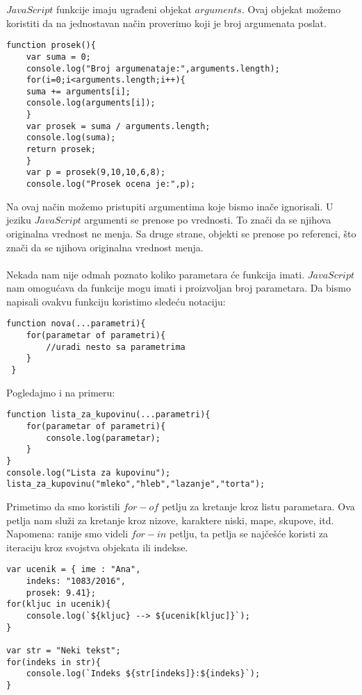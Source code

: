 $JavaScript$ funkcije imaju ugrađeni objekat $arguments$. Ovaj objekat možemo koristiti da na jednostavan način proverimo koji je broj argumenata poslat.
\begin{lstlisting}[backgroundcolor = \color{lightgray}, breaklines=true]
 function prosek(){
	var suma = 0;
	console.log("Broj argumenataje:",arguments.length);
	for(i=0;i<arguments.length;i++){
    suma += arguments[i];
	console.log(arguments[i]);
    }
	var prosek = suma / arguments.length;
    console.log(suma);
	return prosek;
    }
	var p = prosek(9,10,10,6,8);
    console.log("Prosek ocena je:",p);	
\end{lstlisting}
Na ovaj način možemo pristupiti argumentima koje bismo inače ignorisali.
U jeziku $JavaScript$ argumenti se prenose po vrednosti. To znači da se njihova originalna vrednost ne menja. Sa druge strane, objekti se prenose po referenci, što znači da se njihova originalna vrednost menja.\\\\
Nekada nam nije odmah poznato koliko parametara će funkcija imati. $JavaScript$ nam omogućava da funkcije mogu imati i proizvoljan broj parametara. Da bismo napisali ovakvu funkciju koristimo sledeću notaciju:
\begin{lstlisting}[backgroundcolor = \color{lightgray}, breaklines=true]
 function nova(...parametri){
	for(parametar of parametri){
		//uradi nesto sa parametrima	
	} 
 }
\end{lstlisting}
Pogledajmo i na primeru:
\begin{lstlisting}[backgroundcolor = \color{lightgray}, breaklines=true]
function lista_za_kupovinu(...parametri){
	for(parametar of parametri){
    	console.log(parametar);    
    } 
}
console.log("Lista za kupovinu");
lista_za_kupovinu("mleko","hleb","lazanje","torta");
\end{lstlisting}
Primetimo da smo koristili $for-of$ petlju za kretanje kroz listu parametara. Ova petlja nam služi za kretanje kroz nizove, karaktere niski, mape, skupove, itd. Napomena: ranije smo videli $for-in$
petlju, ta petlja se najčešće koristi za iteraciju kroz svojstva objekata ili indekse.
\begin{lstlisting}[backgroundcolor = \color{lightgray}, breaklines=true]
var ucenik = { ime : "Ana",
	indeks: "1083/2016",
    prosek: 9.41};
for(kljuc in ucenik){
	console.log(`${kljuc} --> ${ucenik[kljuc]}`);
}  

var str = "Neki tekst";
for(indeks in str){
	console.log(`Indeks ${str[indeks]}:${indeks}`);
}
\end{lstlisting}

